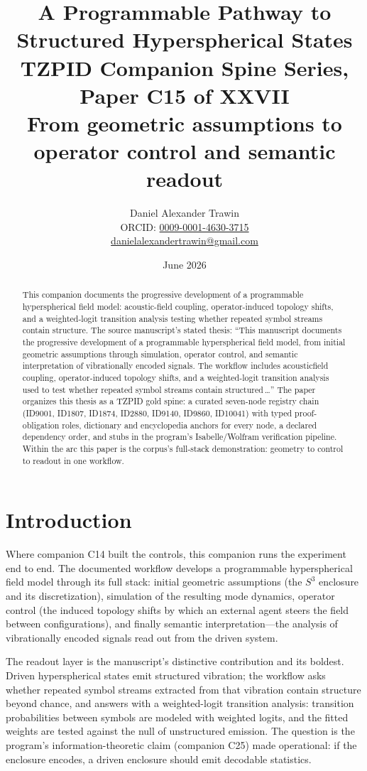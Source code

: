 \documentclass[11pt]{article}
\title{A Programmable Pathway to Structured Hyperspherical States\\[0.6em]
\large TZPID Companion Spine Series, Paper C15 of XXVII\\
\normalsize From geometric assumptions to operator control and semantic readout}
\author{Daniel Alexander Trawin\\
\small ORCID: \href{https://orcid.org/0009-0001-4630-3715}{0009-0001-4630-3715}\\
\small \href{mailto:danielalexandertrawin@gmail.com}{danielalexandertrawin@gmail.com}}
\date{June 2026}
\theoremstyle{remark}
\begin{document}
\maketitle

\begin{abstract}
This companion documents the progressive development of a programmable hyperspherical field model: acoustic-field coupling, operator-induced topology shifts, and a weighted-logit transition analysis testing whether repeated symbol streams contain structure.
The source manuscript's stated thesis: ``This manuscript documents the progressive development of a programmable hyperspherical field model, from initial geometric assumptions through simulation, operator control, and semantic interpretation of vibrationally encoded signals. The workflow includes acousticfield coupling, operator-induced topology shifts, and a weighted-logit transition analysis used to test whether repeated symbol streams contain structured\,\ldots'' The paper organizes this thesis as a TZPID gold spine: a curated seven-node registry chain (ID9001, ID1807, ID1874, ID2880, ID9140, ID9860, ID10041) with typed proof-obligation roles, dictionary and encyclopedia anchors for every node, a declared dependency order, and stubs in the program's Isabelle/Wolfram verification pipeline. Within the arc this paper is the corpus's full-stack demonstration: geometry to control to readout in one workflow.
\end{abstract}

\section{Introduction}
\label{sec:intro}

Where companion C14 built the controls, this companion runs the experiment end to end. The documented workflow develops a programmable hyperspherical field model through its full stack: initial geometric assumptions (the $S^3$ enclosure and its discretization), simulation of the resulting mode dynamics, operator control (the induced topology shifts by which an external agent steers the field between configurations), and finally semantic interpretation---the analysis of vibrationally encoded signals read out from the driven system.

The readout layer is the manuscript's distinctive contribution and its boldest. Driven hyperspherical states emit structured vibration; the workflow asks whether repeated symbol streams extracted from that vibration contain structure beyond chance, and answers with a weighted-logit transition analysis: transition probabilities between symbols are modeled with weighted logits, and the fitted weights are tested against the null of unstructured emission. The question is the program's information-theoretic claim (companion C25) made operational: if the enclosure encodes, a driven enclosure should emit decodable statistics.
\end{document}
